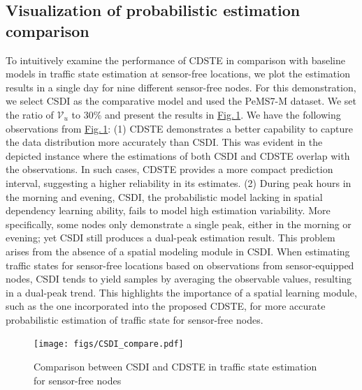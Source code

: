 \documentclass[a4paper,fleqn,12pt]{cas-sc}
\begin{document}
\subsection{Visualization of probabilistic estimation comparison}
To intuitively examine the performance of CDSTE in comparison with baseline models in traffic state estimation at sensor-free locations, we plot the estimation results in a single day for nine different sensor-free nodes. For this demonstration, we select CSDI as the comparative model and used the PeMS7-M dataset. We set the ratio of $\mathcal{V}_{u}$ to 30\% and present the results in \hyperref[fig:CSDI_compare]{Fig.\,\ref{fig:CSDI_compare}}. We have the following observations from \hyperref[fig:CSDI_compare]{Fig.\,\ref{fig:CSDI_compare}}: (1) CDSTE demonstrates a better capability to capture the data distribution more accurately than CSDI. This was evident in the depicted instance where the estimations of both CSDI and CDSTE overlap with the observations. In such cases, CDSTE provides a more compact prediction interval, suggesting a higher reliability in its estimates. (2) During peak hours in the morning and evening, CSDI, the probabilistic model lacking in spatial dependency learning ability, fails to model high estimation variability. More specifically, some nodes only demonstrate a single peak, either in the morning or evening; yet CSDI still produces a dual-peak estimation result. This problem arises from the absence of a spatial modeling module in CSDI. When estimating traffic states for sensor-free locations based on observations from sensor-equipped nodes, CSDI tends to yield samples by averaging the observable values, resulting in a dual-peak trend. This highlights the importance of a spatial learning module, such as the one incorporated into the proposed CDSTE, for more accurate probabilistic estimation of traffic state for sensor-free nodes.

\begin{figure}[pos=htbp,width=15cm,align=\centering]
  \centering 
  \texttt{[image: figs/CSDI\_compare.pdf]}
  \caption{Comparison between CSDI and CDSTE in traffic state estimation for sensor-free nodes}\label{fig:CSDI_compare}
\end{figure}
\end{document}
